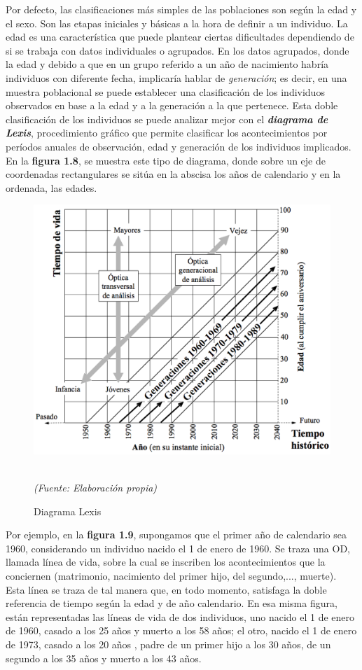 Por defecto, las clasificaciones m\'as simples de las poblaciones son seg\'un la edad y el sexo. Son las etapas iniciales y b\'asicas a la hora de definir a un individuo. La edad es una caracter\'istica que puede plantear ciertas dificultades dependiendo de si se trabaja con datos individuales o agrupados. En los datos agrupados, donde la edad y debido a que en un grupo referido a un a\~no de nacimiento habr\'ia individuos con diferente fecha, implicar\'ia hablar de \textit{generaci\'on}; es decir, en una muestra poblacional se puede establecer una clasificaci\'on de los individuos observados en base a la edad y a la generaci\'on a la que pertenece. Esta doble clasificaci\'on de los individuos se puede analizar mejor con el \textit{\textbf{diagrama de Lexis}}, procedimiento gr\'afico que permite clasificar los acontecimientos por per\'iodos anuales de observaci\'on, edad y generaci\'on de los individuos implicados. En la \textbf{figura 1.8}, se muestra este tipo de diagrama, donde sobre un eje de coordenadas  rectangulares se sit\'ua en la abscisa los a\~nos de calendario y en la ordenada, las edades.

\newpage
\begin{figure}[!ht]
\centering
\includegraphics[scale=0.35]{Cap1/lexis.png}
\caption{Diagrama Lexis}\\
\textit{(Fuente: Elaboraci\'on propia)}
\end{figure}

Por ejemplo, en la \textbf{figura 1.9}, supongamos que el primer a\~no de calendario sea 1960, considerando un individuo nacido el 1 de enero de 1960. Se traza una OD, llamada l\'inea de vida, sobre la cual se inscriben los acontecimientos que la conciernen (matrimonio, nacimiento del primer hijo, del segundo,..., muerte). Esta l\'inea se traza de tal manera que, en todo momento, satisfaga la doble referencia de tiempo seg\'un la edad y de a\~no calendario. En esa misma figura, est\'an representadas las l\'ineas de vida de dos individuos, uno nacido el 1 de enero de 1960, casado a los 25 a\~nos y muerto a los 58 a\~nos; el otro, nacido el 1 de enero de 1973, casado a los 20 a\~nos , padre de un primer hijo a los 30 a\~nos, de un segundo a los 35 a\~nos y muerto a los 43 a\~nos.

